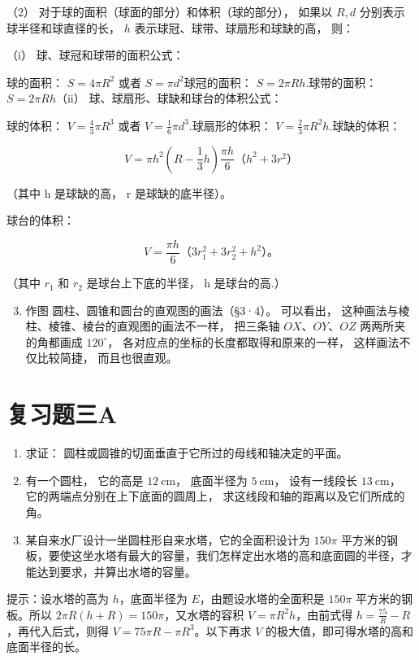 （2） 对于球的面积（球面的部分）和体积（球的部分）， 如果以 \(R, d\)
分别表示球半径和球直径的长， \(h\) 表示球冠、球带、球扇形和球缺的高，
则：

（i） 球、球冠和球带的面积公式：

球的面积： \(S = 4\pi R^2\) 或者 \(S = \pi d^2\)球冠的面积：
\(S = 2\pi Rh.\)球带的面积： \(S = 2\pi Rh\)（ii）
球、球扇形、球缺和球台的体积公式：

球的体积： \(V = \frac{4}{3}\pi R^3\) 或者
\(V = \frac{1}{6}\pi d^3.\)球扇形的体积：
\(V = \frac{2}{3}\pi R^2 h.\)球缺的体积：

\[
V = \pi h ^ {2} \left(R - \frac {1}{3} h\right) \frac {\pi h}{6} \text{（}h ^ {2} + 3 r ^ {2}\text{）}
\]

（其中 h 是球缺的高， r 是球缺的底半径）。

球台的体积：

\[
V = \frac {\pi h}{6} \text{（}3 r _ {1} ^ {2} + 3 r _ {2} ^ {2} + h ^ {2}\text{）。}
\]

（其中 \(r_{1}\) 和 \(r_{2}\) 是球台上下底的半径， h 是球台的高.）

\begin{enumerate}
\setcounter{enumi}{2}
\item
  作图 圆柱、圆锥和圆台的直观图的画法（§3·4）。 可以看出，
  这种画法与棱柱、棱锥、棱台的直观图的画法不一样， 把三条轴
  \(OX\)、\(OY\)、\(OZ\) 两两所夹的角都画成 \(120^{\circ}\)，
  各对应点的坐标的长度都取得和原来的一样， 这样画法不仅比较简捷，
  而且也很直观。
\end{enumerate}

\section{复习题三A}

\begin{enumerate}
\item
  求证： 圆柱或圆锥的切面垂直于它所过的母线和轴决定的平面。
\item
  有一个圆柱， 它的高是 \(12 \mathrm{~cm}\)， 底面半径为
  \(5 \mathrm{~cm}\)， 设有一线段长 \(13 \mathrm{~cm}\)，
  它的两端点分别在上下底面的圆周上，
  求这线段和轴的距离以及它们所成的角。
\item
  某自来水厂设计一坐圆柱形自来水塔，它的全面积设计为 \(150\pi\)
  平方米的钢板，要使这坐水塔有最大的容量，我们怎样定出水塔的高和底面圆的半径，才能达到要求，并算出水塔的容量。
\end{enumerate}

提示：设水塔的高为 \(h\)，底面半径为 \(E\)，由题设水塔的全面积是
\(150\pi\) 平方米的钢板。所以 \(2\pi R(h + R) = 150\pi\)，又水塔的容积
\(V = \pi R^2 h\)，由前式得 \(h = \frac{75}{R} - R\)，再代入后式，则得
\(V = 75\pi R - \pi R^3\)。以下再求 \(V\)
的极大值，即可得水塔的高和底面半径的长。

